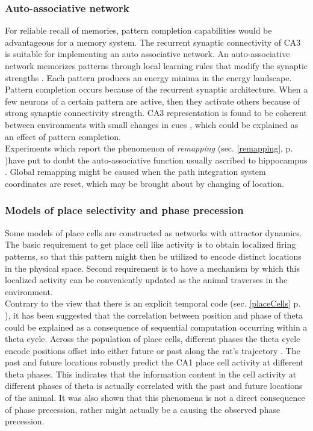 \subsubsection{Auto-associative network}
\label{autoasso}
For reliable recall of memories, pattern completion capabilities would be advantageous for a memory system. The recurrent synaptic connectivity of CA3 is suitable for implementing an auto associative network. An auto-associative network memorizes patterns through local learning rules that modify the synaptic strengths \cite{Hopfield1982}. Each pattern produces an energy minima in the energy landscape. Pattern completion occurs because of the recurrent synaptic architecture. When a few neurons of a certain pattern are active, then they activate others because of strong synaptic connectivity strength. CA3 representation is found to be coherent between environments with small changes in cues \cite{Lee2004, Vazdarjanova2004}, which could be explained as an effect of pattern completion. \\
Experiments which report the phenomenon of \emph{remapping} \cite{Kubie1987, Wills2005, Leutgeb2005} (sec. \ref{remapping}, p. \pageref{remapping})have put to doubt the auto-associative function usually ascribed to  hippocampus \cite{Colgin2010}. Global remapping might be caused when the path integration system coordinates are reset, which may be brought about by changing of location.   

\subsubsection{Models of place selectivity and phase precession}
Some models of place cells are constructed as networks with attractor dynamics. The basic requirement to get place cell like activity is to obtain localized firing patterns, so that this pattern might then be utilized to encode distinct locations in the physical space. Second requirement is to have a mechanism by which this localized activity can be conveniently updated as the animal traverses in the environment.  \\

Contrary to the view that there is an explicit temporal code (sec. \ref{placeCells} p. \pageref{placeCells}), it has been suggested that the correlation between position and phase of theta could be explained as a consequence of sequential computation occurring within a theta cycle. Across the population of place cells, different phases the theta cycle encode positions offset into either future or past along the rat's trajectory \cite{Itskov2008}. The past and future locations robustly predict the CA1 place cell activity at different theta phases. This indicates that the information content in the cell activity at different phases of theta is actually correlated with the past and future locations of the animal. It was also shown that this phenomena is not a direct consequence of phase precession, rather might actually be a causing the observed phase precession. \\

